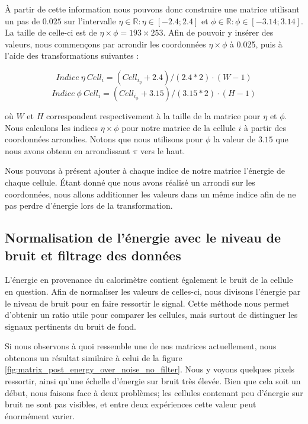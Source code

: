 À partir de cette information nous pouvons donc construire une matrice utilisant un pas de $0.025$ sur l'intervalle $\eta \in \mathbb{R} : \eta \in [-2.4;2.4]$ et $\phi \in \mathbb{R} : \phi \in [-3.14;3.14]$. La taille de celle-ci est de $\eta \times \phi = 193 \times 253$. Afin de pouvoir y insérer des valeurs, nous commençons par arrondir les coordonnées $\eta \times \phi$ à 0.025, puis à l'aide des transformations suivantes :

\label{formula:compute_indices}

\[Indice \: \eta \: Cell_{i} = (Cell_{i_{\eta}} + 2.4) / (2.4*2) \cdot (W-1)\]
\[Indice \: \phi \: Cell_{i} = (Cell_{i_{\phi}} + 3.15) / (3.15*2) \cdot (H-1)\]

où $W$ et $H$ correspondent respectivement à la taille de la matrice pour $\eta$ et $\phi$. Nous calculons les indices $\eta \times \phi$ pour notre matrice de la cellule $i$ à partir des coordonnées arrondies. Notons que nous utilisons pour $\phi$ la valeur de $3.15$ que nous avons obtenu en arrondissant $\pi$ vers le haut.

Nous pouvons à présent ajouter à chaque indice de notre matrice l'énergie de chaque cellule. Étant donné que nous avons réalisé un arrondi sur les coordonnées, nous allons additionner les valeurs dans un même indice afin de ne pas perdre d'énergie lors de la transformation.\\

\subsection{Normalisation de l'énergie avec le niveau de bruit et filtrage des données}

L'énergie en provenance du calorimètre contient également le bruit de la cellule en question. Afin de normaliser les valeurs de celles-ci, nous divisons l'énergie par le niveau de bruit pour en faire ressortir le signal. Cette méthode nous permet d'obtenir un ratio utile pour comparer les cellules, mais surtout de distinguer les signaux pertinents du bruit de fond.

Si nous observons à quoi ressemble une de nos matrices actuellement, nous obtenons un résultat similaire à celui de la figure \ref{fig:matrix_post_energy_over_noise_no_filter}. Nous y voyons quelques pixels ressortir, ainsi qu'une échelle d'énergie sur bruit très élevée. Bien que cela soit un début, nous faisons face à deux problèmes; les cellules contenant peu d'énergie sur bruit ne sont pas visibles, et entre deux expériences cette valeur peut énormément varier.

